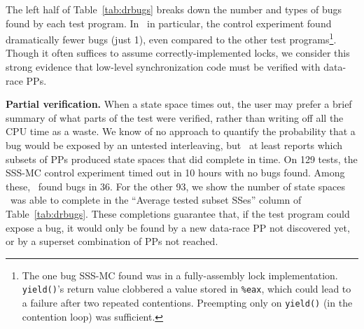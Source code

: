 The left half of Table~\ref{tab:drbugs}
breaks down the number and types of bugs found by each test program.
In \mxtest~in particular, the control experiment found dramatically fewer bugs (just 1),
even compared to the other test programs\footnote{
	The one bug SSS-MC found was in a fully-assembly lock implementation. {\tt yield()}'s return value clobbered a value stored in {\tt \%eax}, which could lead to a failure after two repeated contentions. Preempting only on {\tt yield()} (in the contention loop) was sufficient.}.
Though it often suffices to assume correctly-implemented locks,
we consider this strong evidence that low-level synchronization code must be verified with data-race PPs.

{\bf Partial verification.}
When a state space times out, the user may prefer a brief summary of what parts of the test were verified, rather than writing off all the CPU time as a waste.
We know of no approach to quantify the probability
that a bug would be exposed by an untested interleaving,
but \quicksand~at least reports which subsets of PPs produced state spaces that did complete in time.
On 129 tests, the SSS-MC control experiment timed out in 10 hours with no bugs found.
Among these, \quicksand~found bugs in 36.
For the other 93, we show the number of state spaces \quicksand~was able to complete in the ``Average tested subset SSes'' column of Table~\ref{tab:drbugs}.
These completions guarantee that, if the test program could expose a bug,
it would only be found by a new data-race PP not discovered yet, or by a superset combination of PPs not reached.

